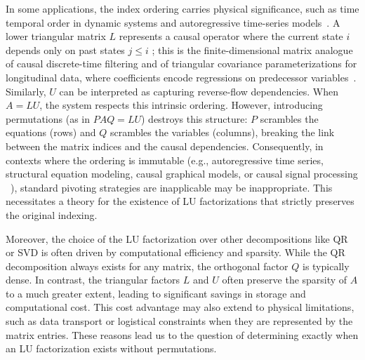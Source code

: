 \documentclass[10pt,twoside]{siamart1116}
\numberwithin{theorem}{section}
\providecommand{\DIFadd}[1]{{\protect\color{blue} \sf #1}} %
\providecommand{\DIFdel}[1]{{\protect\color{red} \scriptsize #1}} %
\providecommand{\DIFaddbegin}{} %
\providecommand{\DIFaddend}{} %
\providecommand{\DIFdelbegin}{} %
\providecommand{\DIFdelend}{} %
\begin{document}
In some applications, the index ordering carries physical significance, such as \DIFdelbegin \DIFdel{time }\DIFdelend \DIFaddbegin \DIFadd{temporal order }\DIFaddend in dynamic systems \DIFaddbegin \DIFadd{and autoregressive time-series models~\cite{hamilton_time_1994,granger_investigating_1969}}\DIFaddend . A lower triangular matrix $L$ represents a causal operator where the current state $i$ depends only on past states $j \le i$\DIFaddbegin \DIFadd{; this is the finite-dimensional matrix analogue of causal discrete-time filtering and of triangular covariance parameterizations for longitudinal data, where coefficients encode regressions on predecessor variables~\cite{oppenheim_discrete_2010,pourahmadi_joint_1999}}\DIFaddend . Similarly, $U$ can be interpreted as capturing reverse-flow dependencies. When $A=LU$, the system respects this intrinsic ordering. However, introducing permutations (as in $PAQ = LU$) destroys this structure: $P$ scrambles the equations (rows) and $Q$ scrambles the variables (columns), breaking the link between the matrix indices and the causal dependencies. Consequently, in contexts where the ordering is immutable (e.g., autoregressive time series, structural equation modeling, \DIFaddbegin \DIFadd{causal graphical models, }\DIFaddend or causal signal processing\DIFaddbegin \DIFadd{~\cite{bollen_structural_1989,pearl_causality_2009,peters_elements_2017}}\DIFaddend ), standard pivoting strategies \DIFdelbegin \DIFdel{are inapplicable}\DIFdelend \DIFaddbegin \DIFadd{may be inappropriate}\DIFaddend . This necessitates a theory for the existence of LU factorizations that strictly preserves the original indexing.

Moreover, the choice of the LU factorization over other decompositions like QR or SVD is often driven by computational efficiency and sparsity. While the QR decomposition always exists for any matrix, the orthogonal factor $Q$ is typically dense. In contrast, the triangular factors $L$ and $U$ often preserve the sparsity of $A$ to a much greater extent, leading to significant savings in storage and computational cost. This cost advantage may also extend to physical limitations, such as data transport or logistical constraints when they are represented by the matrix entries. These reasons lead us to the question of determining exactly when an LU factorization exists without permutations.
\end{document}
